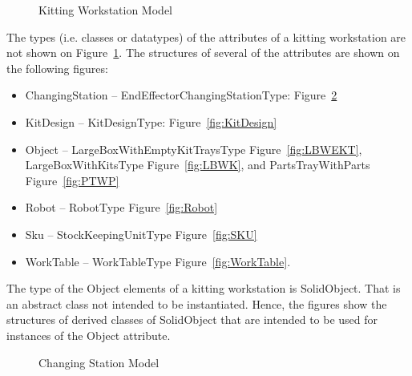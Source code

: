 \begin{figure}[h]
\caption{Kitting Workstation Model}
\label{fig:WorkstationModel}
\end{figure}

The types (i.e. classes or datatypes) of the attributes of a kitting
workstation are not shown on Figure~\ref{fig:WorkstationModel}. The
structures of several of the attributes are shown on the following figures:
\begin{itemize}
\item ChangingStation -- EndEffectorChangingStationType:
  Figure~\ref{fig:ChangingStation}
\item KitDesign -- KitDesignType: Figure~\ref{fig:KitDesign}
\item Object -- LargeBoxWithEmptyKitTraysType Figure~\ref{fig:LBWEKT},
  LargeBoxWithKitsType Figure~\ref{fig:LBWK}, and PartsTrayWithParts
  Figure~\ref{fig:PTWP}
\item Robot -- RobotType Figure~\ref{fig:Robot}
\item Sku -- StockKeepingUnitType Figure~\ref{fig:SKU}
\item WorkTable -- WorkTableType Figure~\ref{fig:WorkTable}.
\end{itemize}

The type of the Object elements of a kitting workstation is
SolidObject. That is an abstract class not intended to be
instantiated. Hence, the figures show the structures of derived classes of
SolidObject that are intended to be used for instances of the Object
attribute.

\begin{flushleft}
\end{flushleft}
\begin{figure}[h]
\caption{Changing Station Model}
\label{fig:ChangingStation}
\end{figure}

